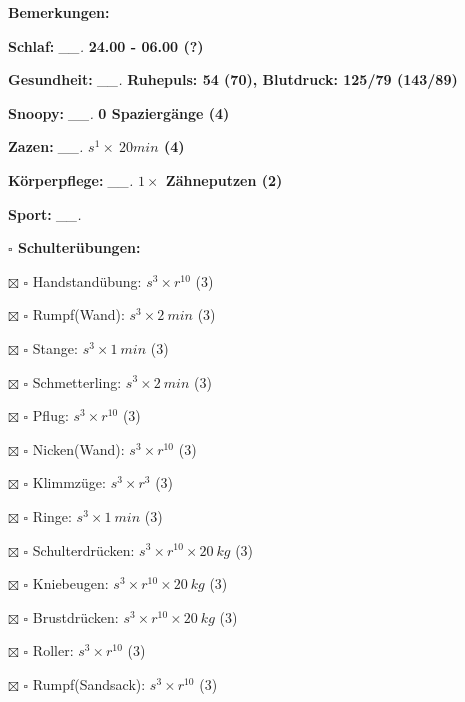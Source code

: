 \documentclass[10pt,a4paper]{article}
\newcommand\prop[1] {{\color {alizarin} {\bf #1}}}             %
\newcommand\draf[1] {{\color {amber(sae/ece)} {\bf #1}}}       %
\newcommand\mand[1] {{\color {burntorange} {\bf #1}}}          %
\newcommand\topspace{\vskip -15pt \hskip 20pt}
\newcommand\n[1] { {\sl #1.} \hskip 5pt }
\begin{document}
\begin{mdframed}[style=daystyle]
  \begin{labeling}{{\mand {Bemerkungen:}}}
    \setlength\itemsep{-3pt}
  \item[{\mand {Schlaf:}}]       \n{\_\_} {\prop {24.00 - 06.00 (?)}}
  \item[{\mand {Gesundheit:}}]   \n{\_\_} {\prop {Ruhepuls: 54 (70), Blutdruck: 125/79 (143/89)}}
  \item[{\mand {Snoopy:}}]       \n{\_\_} {\prop {0 Spaziergänge (4)}}    
  \item[{\mand {Zazen:}}]        \n{\_\_} {\draf {$s^1 \times\ 20 min$ (4)}}
  \item[{\mand {Körperpflege:}}] \n{\_\_} {\draf {$1 \times$ Zähneputzen (2)}}
  \item[{\mand {Sport:}}]        \n{\_\_}
    \topspace
    \begin{minipage}{0.75\textwidth}  
      \begin{labeling}{\prop {$\square$ {Schulterübungen:}}} 
        \setlength\itemsep{-3pt}
      \item[$\boxtimes$ $\square$ Handstandübung:]  $s^3 \times r^{10}$ (3)
      \item[$\boxtimes$ $\square$ Rumpf(Wand):]     $s^3 \times 2\ min$ (3)
      \item[$\boxtimes$ $\square$ Stange:]          $s^3 \times 1\ min$ (3)
      \item[$\boxtimes$ $\square$ Schmetterling:]   $s^3 \times 2\ min$ (3)
      \item[$\boxtimes$ $\square$ Pflug:]           $s^3 \times r^{10}$ (3)
      \item[$\boxtimes$ $\square$ Nicken(Wand):]    $s^3 \times r^{10}$ (3)
      \item[$\boxtimes$ $\square$ Klimmzüge:]       $s^3 \times r^3$ (3)
      \item[$\boxtimes$ $\square$ Ringe:]           $s^3 \times 1\ min$ (3)
      \item[$\boxtimes$ $\square$ Schulterdrücken:] $s^3 \times r^{10} \times 20\ kg$ (3)
      \item[$\boxtimes$ $\square$ Kniebeugen:]      $s^3 \times r^{10} \times 20\ kg$ (3)
      \item[$\boxtimes$ $\square$ Brustdrücken:]    $s^3 \times r^{10} \times 20\ kg$ (3)
      \item[$\boxtimes$ $\square$ Roller:]          $s^3 \times r^{10}$ (3)
      \item[$\boxtimes$ $\square$ Rumpf(Sandsack):] $s^3 \times r^{10}$ (3)

\end{labeling}
\end{minipage}
\end{labeling}
\end{mdframed}
\end{document}
